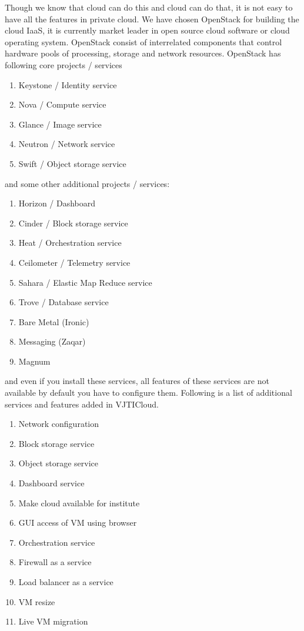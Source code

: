 Though we know that cloud can do this and cloud can do that, it is not easy to have all the features in private cloud. We have chosen OpenStack for building the cloud IaaS, it is currently market leader in open source cloud software or cloud operating system. OpenStack consist of interrelated components that control hardware pools of processing, storage and network resources\cite{wiki}. OpenStack has following core projects / services
\begin{enumerate}
    \item Keystone / Identity service
    \item Nova / Compute service
    \item Glance / Image service
    \item Neutron / Network service
    \item Swift / Object storage service
\end{enumerate}

and some other additional projects / services:
\begin{enumerate}
    \item Horizon / Dashboard
    \item Cinder / Block storage service
    \item Heat / Orchestration service
    \item Ceilometer / Telemetry service
    \item Sahara / Elastic Map Reduce service
    \item Trove / Database service
    \item Bare Metal (Ironic)
    \item Messaging (Zaqar)
    \item Magnum
\end{enumerate}

and even if you install these services, all features of these services are not available by default you have to configure them. Following is a list of additional services and features added in VJTICloud.

\begin{enumerate}
  \item Network configuration
  \item Block storage service
  \item Object storage service
  \item Dashboard service
  \item Make cloud available for institute
  \item GUI access of VM using browser
  \item Orchestration service
  \item Firewall as a service
  \item Load balancer as a service
  \item VM resize 
  \item Live VM migration
\end{enumerate}

